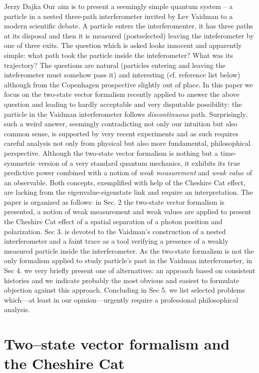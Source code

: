 \begin{artengenv}{Jerzy Dajka}
Our aim is to present a seemingly simple quantum system -- a particle in a nested three-path interferometer invited by Lev Vaidman to a modern scientific debate. A particle enters the interferomenter, it has three paths at its disposal and then it is measured (postselected) leaving the inteferometer by one of three exits. The question which is asked looks innocent and apparently simple: what path took the particle inside the inteferometer? What was its trajectory? The questions are natural (particles entering and leaving the inteferometer must somehow pass it) and interesting (cf. reference list below) although  from the Copenhagen prospective slightly out of place.  In this paper we focus on  the two-state vector formalism recently applied to answer the above question and leading to hardly acceptable and very disputable possibility: the particle in the Vaidman interferometer follows {\it discontinuous}  path. Surprisingly, such a weird answer, seemingly contradicting not only our intuition but also common sense,  is supported by very recent experiments and as such requires careful analysis not only from physical but also more fundamental, philosophical perspective. Although the two-state vector formalism is nothing but a time-symmetric version of a very standard quantum mechanics, it exhibits its true predictive power combined with a notion of {\it weak measurement} and {\it weak value} of an observable. Both concepts, exemplified with help of the Cheshire Cat effect, are lacking from the eigenvalue-eigenstate link and require an interpretation.  The paper is organized as follows: in Sec. 2 the two-state vector formalism is presented, a notion of weak measurement and weak values are applied to present the Cheshire Cat effect of a spatial separation of a photon position and polarization. Sec 3. is devoted to the Vaidman's construction of a nested  interferometer and a faint trace  as a tool verifying a presence of a weakly measured particle inside the interferometer. As  the two-state formalism is not the only formalism applied to study particle's past in the Vaidman interferometer,    in Sec 4. we very briefly present one of  alternatives: an approach based on consistent histories and we indicate probably the  most obvious and easiest to formulate objection against this approach. Concluding in Sec 5. we list selected problems which---at least in our opinion---urgently require a professional philosophical analysis. 

\section{Two--state vector formalism and the Cheshire Cat}


\end{artengenv}
